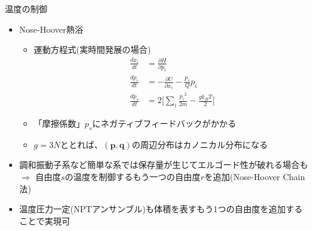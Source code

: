 
\begin{frame}[t,fragile]{温度の制御}
  \begin{itemize}
  \item Nose-Hoover熱浴
    \begin{itemize}
    \item 運動方程式(実時間発展の場合)
      \begin{align*}
        \frac{dx_i}{dt} &= \frac{\partial H}{\partial p_i} \\
        \frac{dp_i}{dt} &= -\frac{\partial U}{\partial x_i} -\frac{p_s}{Q} p_i \\
        \frac{dp_s}{dt} &= 2 \big[ \sum_i \frac{{p_i}^2}{2m} - \frac{g k_B T}{2} \big]
      \end{align*}
    \item 「摩擦係数」$p_s$にネガティブフィードバックがかかる
    \item $g=3N$ととれば、$(\mathbf{p},\mathbf{q})$の周辺分布はカノニカル分布になる
    \end{itemize}
  \item 調和振動子系など簡単な系では保存量が生じてエルゴード性が破れる場合も $\Rightarrow$ 自由度$s$の温度を制御するもう一つの自由度$r$を追加(Nose-Hoover Chain法) 
  \item 温度圧力一定(NPTアンサンブル)も体積を表すもう1つの自由度を追加することで実現可
  \end{itemize}
\end{frame}

